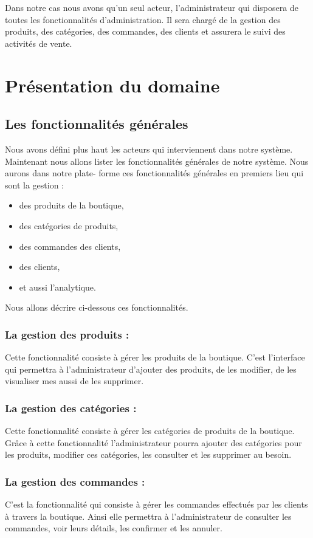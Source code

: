 \documentclass[a4paper, 12pt]{report}
\begin{document}
Dans notre cas nous avons qu'un seul acteur, l'administrateur qui disposera de toutes les fonctionnalités
d’administration. Il sera chargé de la gestion des produits, des catégories, des commandes, des clients et assurera le suivi des activités de vente.
\section{Présentation du domaine}
\subsection{Les fonctionnalités générales}
Nous avons défini plus haut les acteurs qui interviennent dans notre système. Maintenant
nous allons lister les fonctionnalités générales de notre système. Nous aurons dans notre plate-
forme ces fonctionnalités générales en premiers lieu qui sont la gestion :  
\begin{itemize}
    \item des produits de la boutique,
    \item des catégories de produits,
    \item des commandes des clients,
    \item des clients,
    \item et aussi l'analytique.
\end{itemize}
Nous allons décrire ci-dessous ces fonctionnalités.
\subsubsection{La gestion des produits :}
Cette fonctionnalité consiste à gérer les produits de la boutique. C'est l'interface qui permettra à l'administrateur d'ajouter des produits, de les modifier, de les visualiser mes aussi de les supprimer. 
\subsubsection{La gestion des catégories :}
Cette fonctionnalité consiste à gérer les catégories de produits de la boutique. Grâce à cette fonctionnalité l'administrateur pourra ajouter des catégories pour les produits, modifier ces catégories, les consulter et les supprimer au besoin.
\subsubsection{La gestion des commandes :}
C'est la fonctionnalité qui consiste à gérer les commandes effectués par les clients à travers la boutique. Ainsi elle permettra à l'administrateur de consulter les commandes, voir leurs détails, les confirmer et les annuler.
\end{document}
